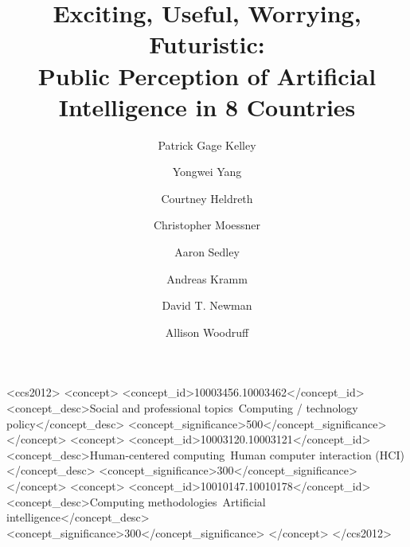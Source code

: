 \documentclass[sigconf]{acmart}
\begin{document}
\fancyhead{}

\title{Exciting, Useful, Worrying, Futuristic:\\ Public Perception of Artificial Intelligence in 8 Countries}

\author{Patrick Gage Kelley}

\author{Yongwei Yang}

\author{Courtney Heldreth}

\author{Christopher Moessner}

\author{Aaron Sedley}

\author{Andreas Kramm}

\author{David T. Newman}

\author{Allison Woodruff}



\begin{CCSXML}
<ccs2012>
<concept>
<concept_id>10003456.10003462</concept_id>
<concept_desc>Social and professional topics~Computing / technology policy</concept_desc>
<concept_significance>500</concept_significance>
</concept>
<concept>
<concept_id>10003120.10003121</concept_id>
<concept_desc>Human-centered computing~Human computer interaction (HCI)</concept_desc>
<concept_significance>300</concept_significance>
</concept>
<concept>
<concept_id>10010147.10010178</concept_id>
<concept_desc>Computing methodologies~Artificial intelligence</concept_desc>
<concept_significance>300</concept_significance>
</concept>
</ccs2012>
\end{CCSXML}



\renewcommand{\shortauthors}{Kelley, et al.}
\end{document}
